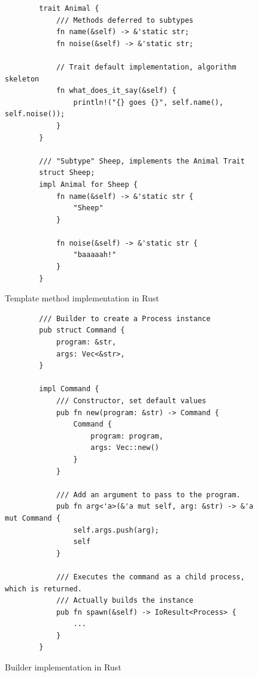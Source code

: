 \documentclass[conference]{IEEEtran}
\begin{document}
\begin{figure}[btp]
    \begin{verbatim}
        trait Animal {
            /// Methods deferred to subtypes
            fn name(&self) -> &'static str;
            fn noise(&self) -> &'static str;

            // Trait default implementation, algorithm skeleton
            fn what_does_it_say(&self) {
                println!("{} goes {}", self.name(), self.noise());
            }
        }

        /// "Subtype" Sheep, implements the Animal Trait
        struct Sheep;
        impl Animal for Sheep {
            fn name(&self) -> &'static str {
                "Sheep"
            }

            fn noise(&self) -> &'static str {
                "baaaaah!"
            }
        }
    \end{verbatim}
    \caption{Template method implementation in Rust}
    \label{fig:template-impl}
\end{figure}

\begin{figure}[btp]
    \begin{verbatim}
        /// Builder to create a Process instance
        pub struct Command {
            program: &str,
            args: Vec<&str>,
        }

        impl Command {
            /// Constructor, set default values
            pub fn new(program: &str) -> Command {
                Command {
                    program: program,
                    args: Vec::new()
                }
            }

            /// Add an argument to pass to the program.
            pub fn arg<'a>(&'a mut self, arg: &str) -> &'a mut Command {
                self.args.push(arg);
                self
            }

            /// Executes the command as a child process, which is returned.
            /// Actually builds the instance
            pub fn spawn(&self) -> IoResult<Process> {
                ...
            }
        }
    \end{verbatim}
    \caption{Builder implementation in Rust}
    \label{fig:builder-impl}
\end{figure}
\end{document}

